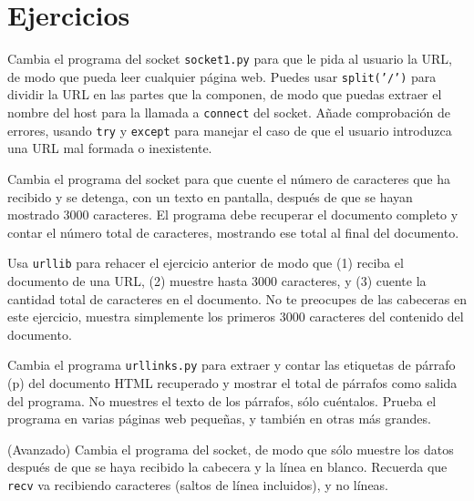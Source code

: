 \section{Ejercicios}

\begin{ex}
Cambia el programa del socket {\tt socket1.py} para que le pida al usuario
la URL, de modo que pueda leer cualquier página web.
Puedes usar {\tt split('/')} para dividir la URL en las partes que la componen,
de modo que puedas extraer el nombre del host para la llamada a {\tt connect} del socket.
Añade comprobación de errores, usando {\tt try} y {\tt except} para manejar el caso de que
el usuario introduzca una URL mal formada o inexistente.  
\end{ex}

\begin{ex}
Cambia el programa del socket para que cuente el número de caracteres que ha recibido
y se detenga, con un texto en pantalla, después de que se hayan mostrado 3000 caracteres. El programa
debe recuperar el documento completo y contar el número total de caracteres,
mostrando ese total al final del documento.
\end{ex}

\begin{ex}
Usa {\tt urllib} para rehacer el ejercicio anterior de modo que (1) reciba el documento
de una URL, (2) muestre hasta 3000 caracteres, y (3) cuente la cantidad total
de caracteres en el documento. No te preocupes de las cabeceras en este ejercicio,
muestra simplemente los primeros 3000 caracteres del contenido del documento.
\end{ex}

\begin{ex}
Cambia el programa {\tt urllinks.py} para extraer y contar
las etiquetas de párrafo (p) del documento HTML recuperado y
mostrar el total de párrafos como
salida del programa.
No muestres el texto de los párrafos, sólo cuéntalos.
Prueba el programa en varias páginas web pequeñas,
y también en otras más grandes.
\end{ex}

\begin{ex}
(Avanzado) Cambia el programa del socket, de modo que sólo muestre los datos
después de que se haya recibido la cabecera y la línea en blanco. Recuerda que {\tt recv}
va recibiendo caracteres (saltos de línea incluidos), y no líneas.
\end{ex}